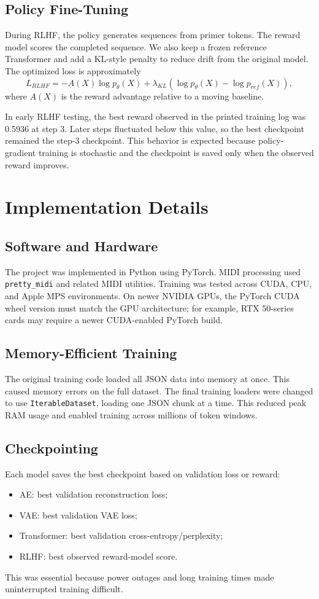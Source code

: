 \documentclass{article}
\begin{document}
\subsection{Policy Fine-Tuning}
During RLHF, the policy generates sequences from primer tokens. The reward model scores the completed sequence. We also keep a frozen reference Transformer and add a KL-style penalty to reduce drift from the original model. The optimized loss is approximately
\[
L_{RLHF} = -A(X) \log p_{\theta}(X) + \lambda_{KL}\left(\log p_{\theta}(X)-\log p_{ref}(X)\right),
\]
where \(A(X)\) is the reward advantage relative to a moving baseline.

In early RLHF testing, the best reward observed in the printed training log was 0.5936 at step 3. Later steps fluctuated below this value, so the best checkpoint remained the step-3 checkpoint. This behavior is expected because policy-gradient training is stochastic and the checkpoint is saved only when the observed reward improves.

\section{Implementation Details}

\subsection{Software and Hardware}
The project was implemented in Python using PyTorch. MIDI processing used \texttt{pretty\_midi} and related MIDI utilities. Training was tested across CUDA, CPU, and Apple MPS environments. On newer NVIDIA GPUs, the PyTorch CUDA wheel version must match the GPU architecture; for example, RTX 50-series cards may require a newer CUDA-enabled PyTorch build.

\subsection{Memory-Efficient Training}
The original training code loaded all JSON data into memory at once. This caused memory errors on the full dataset. The final training loaders were changed to use \texttt{IterableDataset}, loading one JSON chunk at a time. This reduced peak RAM usage and enabled training across millions of token windows.

\subsection{Checkpointing}
Each model saves the best checkpoint based on validation loss or reward:
\begin{itemize}[leftmargin=*]
    \item AE: best validation reconstruction loss;
    \item VAE: best validation VAE loss;
    \item Transformer: best validation cross-entropy/perplexity;
    \item RLHF: best observed reward-model score.
\end{itemize}
This was essential because power outages and long training times made uninterrupted training difficult.
\end{document}
